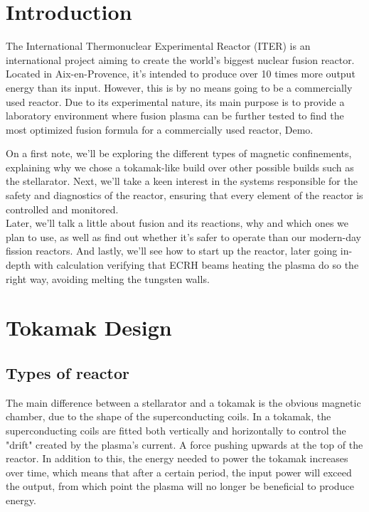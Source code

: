 \documentclass[11pt, openright]{book}
\begin{document}




\vspace*{\fill}
\section{Introduction}

\tab The International Thermonuclear Experimental Reactor (ITER) is an international project aiming to create the world's biggest nuclear fusion reactor. Located in Aix-en-Provence, it's intended to produce over 10 times more output energy than its input. However, this is by no means going to be a commercially used reactor. Due to its experimental nature, its main purpose is to provide a laboratory environment where fusion plasma can be further tested to find the most optimized fusion formula for a commercially used reactor, Demo.

\tab On a first note, we'll be exploring the different types of magnetic confinements, explaining why we chose a tokamak-like build over other possible builds such as the stellarator. Next, we'll take a keen interest in the systems responsible for the safety and diagnostics of the reactor, ensuring that every element of the reactor is controlled and monitored.\\
\tab Later, we'll talk a little about fusion and its reactions, why and which ones we plan to use, as well as find out whether it's safer to operate than our modern-day fission reactors.
And lastly, we'll see how to start up the reactor, later going in-depth with calculation verifying that ECRH beams heating the plasma do so the right way, avoiding melting the tungsten walls.


\newpage

\section{Tokamak Design}

\subsection{Types of reactor}

\tab The main difference between a stellarator and a tokamak is the obvious magnetic chamber, due to the shape of the superconducting coils. In a tokamak, the superconducting coils are fitted both vertically and horizontally to control the "drift" created by the plasma's current. A force pushing upwards at the top of the reactor. In addition to this, the energy needed to power the tokamak increases over time, which means that after a certain period, the input power will exceed the output, from which point the plasma will no longer be beneficial to produce energy.
\end{document}
